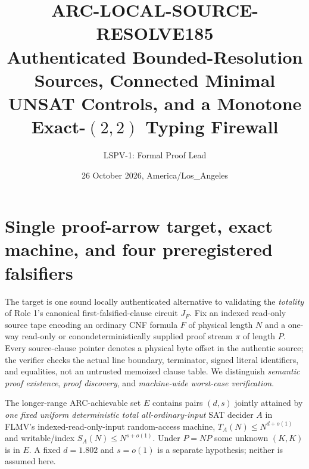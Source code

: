 \documentclass[11pt]{article}
\title{ARC-LOCAL-SOURCE-RESOLVE185\\\large Authenticated Bounded-Resolution Sources, Connected Minimal UNSAT Controls, and a Monotone Exact-$(2,2)$ Typing Firewall}
\author{LSPV-1: Formal Proof Lead}
\date{26 October 2026, America/Los\_Angeles}
\begin{document}
\maketitle
\begin{center}
\end{center}

\section{Single proof-arrow target, exact machine, and four preregistered falsifiers}
The target is one sound locally authenticated alternative to validating the \emph{totality} of Role 1's canonical first-falsified-clause circuit $J_F$. Fix an indexed read-only source tape encoding an ordinary CNF formula $F$ of physical length $N$ and a one-way read-only or conondeterministically supplied proof stream $\pi$ of length $P$. Every source-clause pointer denotes a physical byte offset in the authentic source; the verifier checks the actual line boundary, terminator, signed literal identifiers, and equalities, not an untrusted memoized clause table. We distinguish \emph{semantic proof existence}, \emph{proof discovery}, and \emph{machine-wide worst-case verification}.

The longer-range ARC-achievable set $E$ contains pairs $(d,s)$ jointly attained by \emph{one fixed uniform deterministic total all-ordinary-input} SAT decider $A$ in FLMV's indexed-read-only-input random-access machine, $T_A(N)\le N^{d+o(1)}$ and writable/index $S_A(N)\le N^{s+o(1)}$. Under $P=NP$ some unknown $(K,K)$ is in $E$. A fixed $d=1.802$ and $s=o(1)$ is a separate hypothesis; neither is assumed here.
\end{document}
